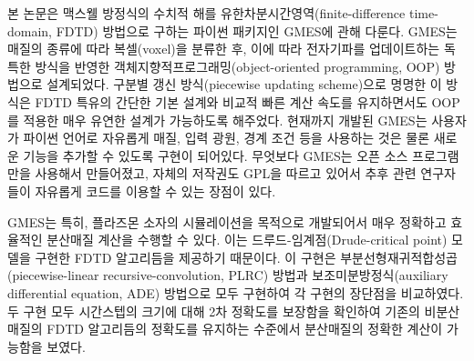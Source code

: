 
본 논문은 맥스웰 방정식의 수치적 해를 유한차분시간영역(finite-difference time-domain, FDTD) 방법으로 구하는 파이썬 패키지인 GMES에 관해 다룬다. GMES는 매질의 종류에 따라 복셀(voxel)을 분류한 후, 이에 따라 전자기파를 업데이트하는 독특한 방식을 반영한 객체지향적프로그래밍(object-oriented programming, OOP) 방법으로 설계되었다. 구분별 갱신 방식(piecewise updating scheme)으로 명명한 이 방식은 FDTD 특유의 간단한 기본 설계와 비교적 빠른 계산 속도를 유지하면서도 OOP를 적용한 매우 유연한 설계가 가능하도록 해주었다. 현재까지 개발된 GMES는 사용자가 파이썬 언어로 자유롭게 매질, 입력 광원, 경계 조건 등을 사용하는 것은 물론 새로운 기능을 추가할 수 있도록 구현이 되어있다. 무엇보다 GMES는 오픈 소스 프로그램만을 사용해서 만들어졌고, 자체의 저작권도 GPL을 따르고 있어서 추후 관련 연구자들이 자유롭게 코드를 이용할 수 있는 장점이 있다.

GMES는 특히, 플라즈몬 소자의 시뮬레이션을 목적으로 개발되어서 매우 정확하고 효율적인 분산매질 계산을 수행할 수 있다. 이는 드루드-임계점(Drude-critical point) 모델을 구현한 FDTD 알고리듬을 제공하기 때문이다. 이 구현은 부분선형재귀적합성곱(piecewise-linear recursive-convolution, PLRC) 방법과 보조미분방정식(auxiliary differential equation, ADE) 방법으로 모두 구현하여 각 구현의 장단점을 비교하였다. 두 구현 모두 시간스텝의 크기에 대해 2차 정확도를 보장함을 확인하여 기존의 비분산매질의 FDTD 알고리듬의 정확도를 유지하는 수준에서 분산매질의 정확한 계산이 가능함을 보였다.
